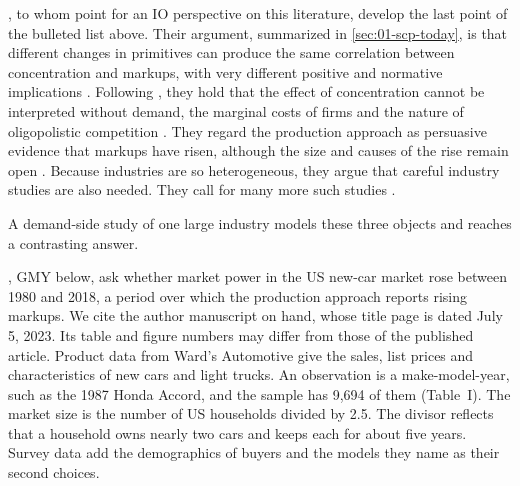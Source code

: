 \citet{BerryGaynorScottMorton2019}, to whom \citet[p.~259, n.~206]{AskerNocke2021} point for an IO perspective on
this literature, develop the last point of the bulleted list above.
Their argument, summarized in \cref{sec:01-scp-today}, is that different changes in primitives can produce the
same correlation between concentration and markups, with very different positive and normative implications
\citep[p.~47]{BerryGaynorScottMorton2019}.
Following \citet{Bresnahan1989}, they hold that the effect of concentration cannot be interpreted without
demand, the marginal costs of firms and the nature of oligopolistic competition
\citep[p.~48]{BerryGaynorScottMorton2019}. They regard the production
approach as persuasive evidence that markups have risen, although the size and causes of the rise remain open
\citep[p.~49]{BerryGaynorScottMorton2019}.
Because industries are so heterogeneous, they argue that careful industry studies are also needed. They call
for many more such studies \citep[pp.~50 and 53]{BerryGaynorScottMorton2019}.

A demand-side study of one large industry models these three objects and reaches a contrasting answer.

\citet{GriecoMurryYurukoglu2024}, GMY below, ask whether market power in the
US new-car market rose between 1980 and 2018, a period over which the production approach reports rising markups. We cite
the author manuscript on hand, whose title page is dated July 5, 2023. Its table and figure numbers may differ
from those of the published article.
Product data from Ward's Automotive give the sales, list prices and characteristics of new
cars and light trucks. An observation is a make-model-year, such as the 1987 Honda Accord, and the sample has
9,694 of them (Table~I). The market size is the number of US households divided by 2.5. The divisor reflects that
a household owns nearly two cars and keeps each for about five years. Survey data add the demographics of buyers
and the models they name as their second choices.

